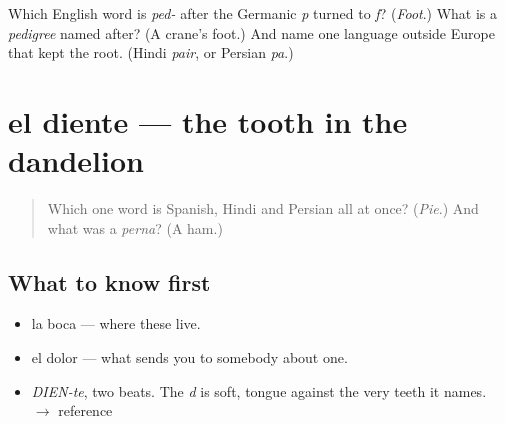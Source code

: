 \begin{tcolorbox}[breakable,colback=teal!4,colframe=teal!35!black,title={Before you move on}]
Which English word is \emph{ped-} after the Germanic \emph{p} turned to \emph{f}? (\emph{Foot}.) What is a \emph{pedigree} named after? (A crane's foot.) And name one language outside Europe that kept the root. (Hindi \emph{pair}, or Persian \emph{pa}.)
\end{tcolorbox}
\section[el diente]{el diente — the tooth in the dandelion}

\label{lesson:ES-C314-diente}



\begin{quote}
Which one word is Spanish, Hindi and Persian all at once? (\emph{Pie}.) And what was a \emph{perna}? (A ham.)
\end{quote}

\subsection*{What to know first}
\begin{itemize}
\raggedright
  \item la boca — where these live.
  \item el dolor — what sends you to somebody about one.
\end{itemize}

\begin{sounds}
\begin{itemize}
\raggedright
  \item \emph{DIEN-te}, two beats. The \emph{d} is soft, tongue against the very teeth it names. $\to$ reference
\end{itemize}
\end{sounds}

